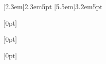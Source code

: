 

\usepackage{booktabs}
\usepackage{titletoc}%
\usepackage{tocloft} %
\usepackage[font=small]{caption}

\contentsmargin{0pt}
\renewcommand\contentspage{\thecontentspage}

[2.3em]{}{2.3em}{5pt}
[5.5em]{}{3.2em}{5pt}


[0pt]%
{}%
{\bfseries\chaptername\ \thecontentslabel\quad}%
{}%
{\bfseries\dotfill\contentspage\\\vspace{0mm}}%

[0pt]%
{}%
{\bfseries\ \thecontentslabel\quad}%
{}%
{\bfseries\dotfill\contentspage\\\vspace{0mm}}%

[0pt]%
{}%
{\hspace{2mm}\bfseries\ \thecontentslabel\quad}%
{}%
{\bfseries\dotfill\contentspage\\\vspace{0mm}}%

\newcommand*{\noaddvspace}{\renewcommand*{\addvspace}[1]{}}
\addtocontents{lof}{\protect\noaddvspace}
\addtocontents{lot}{\protect\noaddvspace}

\usepackage{arabtex}

\usepackage{xeCJK}

\usepackage{mfirstuc}

\usepackage{graphicx}
\graphicspath{ {Images/} }
\usepackage{caption}
\usepackage{subcaption}

\usepackage[a4paper,top=2.54cm,bottom=2.54cm, left=3cm, right=3cm]{geometry}


